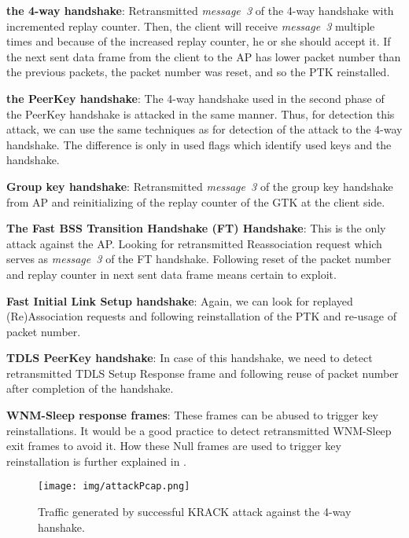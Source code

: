\begin{description}
\item \textbf{the 4-way handshake}: Retransmitted \textit{message~3} of the 4-way handshake with incremented replay counter. Then, the client will receive \textit{message~3} multiple times and because of the increased replay counter, he or she should accept it. If the next sent data frame from the client to the AP has lower packet number than the previous packets, the packet number was reset, and so the PTK reinstalled. 
\item \textbf{the PeerKey handshake}: The 4-way handshake used in the second phase of the PeerKey handshake is attacked in the same manner. Thus, for detection this attack, we can use the same techniques as for detection of the attack to the 4-way handshake. The difference is only in used flags which identify used keys and the handshake.
\item \textbf{Group key handshake}: Retransmitted \textit{message~3} of the group key handshake from AP and reinitializing of the replay counter of the GTK at the client side. 
\item \textbf{The Fast BSS Transition Handshake (FT) Handshake}: This is the only attack against the AP. Looking for retransmitted Reassociation request which serves as \textit{message~3} of the FT handshake. Following reset of the packet number and replay counter in next sent data frame means certain to exploit.
\item \textbf{Fast Initial Link Setup handshake}: Again, we can look for replayed (Re)Association requests and following reinstallation of the PTK and re-usage of packet number.
\item \textbf{TDLS PeerKey handshake}: In case of this handshake, we need to detect retransmitted TDLS Setup Response frame and following reuse of packet number after completion of the handshake.
\item \textbf{WNM-Sleep response frames}: These frames can be abused to trigger key reinstallations. It would be a good practice to detect retransmitted WNM-Sleep exit frames to avoid it. How these Null frames are used to trigger key reinstallation is further explained in \cite{VA_ccs2018}.
\end{description}

\begin{figure}[h!]
  \centering
  \texttt{[image: img/attackPcap.png]}
  \caption[Traffic generated by successful KRACK attack against the 4-way hanshake]{Traffic generated by successful KRACK attack against the 4-way hanshake.}
  \label{fig:krackAttackTraffic}
\end{figure}